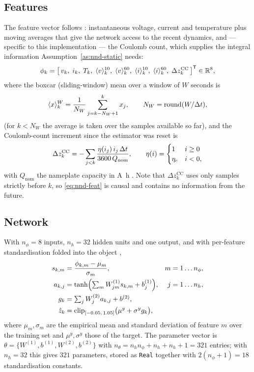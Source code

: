 \subsection{Features}
The feature vector follows \citet{chemali2018dnn}: instantaneous voltage, current and temperature
plus moving averages that give the network access to the recent dynamics, and --- specific to
this implementation --- the Coulomb count, which supplies the integral information
Assumption~\ref{as:nnd-static} needs:
\begin{equation}\label{eq:nnd-feat}
\phi_k = \bigl[\, v_k,\; i_k,\; T_k,\; \langle v\rangle^{10}_k,\; \langle v\rangle^{60}_k,\;
\langle i\rangle^{10}_k,\; \langle i\rangle^{60}_k,\; \Delta z^{\mathrm{CC}}_k \,\bigr]^{\mathsf{T}}
\in\mathbb{R}^{8},
\end{equation}
where the boxcar (sliding-window) mean over a window of $W$ seconds is
\begin{equation}\label{eq:nnd-box}
\langle x\rangle^{W}_k = \frac{1}{N_W}\sum_{j=k-N_W+1}^{k} x_j,\qquad N_W = \operatorname{round}(W/\Delta t),
\end{equation}
(for $k < N_W$ the average is taken over the samples available so far), and the Coulomb-count
increment since the estimator was reset is
\begin{equation}\label{eq:nnd-cc}
\Delta z^{\mathrm{CC}}_k = -\sum_{j<k} \frac{\eta(i_j)\, i_j\, \Delta t}{3600\, Q_{\mathrm{nom}}},
\qquad
\eta(i) = \begin{cases} 1 & i \ge 0\\ \eta_c & i<0,\end{cases}
\end{equation}
with $Q_{\mathrm{nom}}$ the nameplate capacity in \si{\ampere\hour} \citep{ng2009coulomb}.  Note
that $\Delta z^{\mathrm{CC}}_k$ uses only samples strictly before $k$, so \cref{eq:nnd-feat} is
causal and contains no information from the future.

\subsection{Network}
With $n_\phi = 8$ inputs, $n_h = 32$ hidden units and one output, and with per-feature
standardisation folded into the object \citep{bishop1995nn},
\begin{align}
s_{k,m} &= \frac{\phi_{k,m} - \mu_m}{\sigma_m}, & m &= 1\ldots n_\phi, \label{eq:nnd-std}\\
a_{k,j} &= \tanh\Bigl(\textstyle\sum_{m} W^{(1)}_{jm} s_{k,m} + b^{(1)}_j\Bigr), & j &= 1\ldots n_h,
\label{eq:nnd-hidden}\\
g_k     &= \textstyle\sum_j W^{(2)}_{j} a_{k,j} + b^{(2)}, \label{eq:nnd-out}\\
\hat z_k &= \operatorname{clip}_{[-0.05,\,1.05]}\bigl(\mu^y + \sigma^y g_k\bigr), \label{eq:nnd-desc}
\end{align}
where $\mu_m,\sigma_m$ are the empirical mean and standard deviation of feature $m$ over the
training set and $\mu^y,\sigma^y$ those of the target.  The parameter vector is
$\theta = \{W^{(1)}, b^{(1)}, W^{(2)}, b^{(2)}\}$ with
$n_\theta = n_h n_\phi + n_h + n_h + 1 = \num{321}$ entries; with $n_h=32$ this gives
$\num{321}$ parameters, stored as \texttt{Real} together with $2(n_\phi + 1) = 18$ standardisation
constants.

